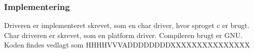 \documentclass[Rapport/RPi/RPI.tex]{subfiles}
\begin{document}
\subsubsection{Implementering}
Driveren er implementeret skrevet, som en char driver, hvor sproget c er brugt. Char driveren er skrevet, som en platform driver. Compileren brugt er GNU. Koden findes vedlagt som HHHHVVVADDDDDDDDXXXXXXXXXXXXXXX
\end{document}
